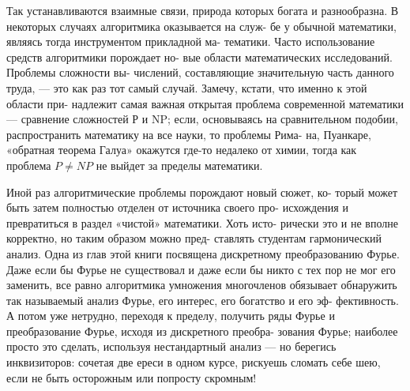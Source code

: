 {{   Так устанавливаются взаимные связи, природа которых богата и\linebreak
разнообразна. В некоторых случаях алгоритмика оказывается на служ-\linebreak
бе у обычной математики, являясь тогда инструментом прикладной ма-\linebreak
тематики. Часто использование средств алгоритмики порождает но-\linebreak
вые области математических исследований. Проблемы сложности вы-\linebreak
числений, составляющие значительную часть данного труда, — это как\linebreak
раз тот самый случай. Замечу, кстати, что именно к этой области при-\linebreak
надлежит самая важная открытая проблема современной математики\linebreak
— сравнение сложностей Р и NP; если, основываясь на сравнительном\linebreak
подобии, распространить математику на все науки, то проблемы Рима-\linebreak
на, Пуанкаре, «обратная теорема Галуа» окажутся где-то недалеко от\linebreak
химии, тогда как проблема $P \neq N P$ не выйдет за пределы математики.\linebreak

\pagebreak
   Иной раз алгоритмические проблемы порождают новый сюжет, ко-\linebreak
торый может быть затем полностью отделен от источника своего про-\linebreak
исхождения и превратиться в раздел «чистой» математики. Хоть исто-\linebreak
рически это и не вполне корректно, но таким образом можно пред-\linebreak
ставлять студентам гармонический анализ. Одна из глав этой книги\linebreak
посвящена дискретному преобразованию Фурье. Даже если бы Фурье\linebreak
не существовал и даже если бы никто с тех пор не мог его заменить,\linebreak
все равно алгоритмика умножения многочленов обязывает обнаружить\linebreak
так называемый анализ Фурье, его интерес, его богатство и его эф-\linebreak
фективность. А потом уже нетрудно, переходя к пределу, получить\linebreak
ряды Фурье и преобразование Фурье, исходя из дискретного преобра-\linebreak
зования Фурье; наиболее просто это сделать, используя нестандартный\linebreak
анализ — но берегись инквизиторов: сочетая две ереси в одном курсе,\linebreak
рискуешь сломать себе шею, если не быть осторожным или попросту\linebreak
скромным!

}}

